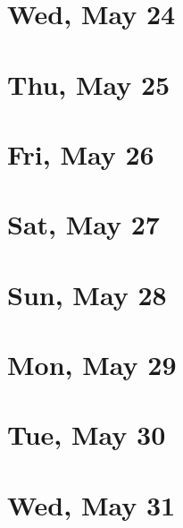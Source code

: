 	\section{Wed, May 24}
		
	\section{Thu, May 25}
		
	\section{Fri, May 26}
		
	\section{Sat, May 27}
		
	\section{Sun, May 28}
		
	\section{Mon, May 29}
		
	\section{Tue, May 30}
		
	\section{Wed, May 31}
		
